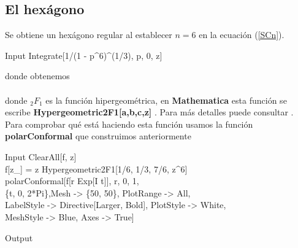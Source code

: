 \subsection{El hexágono}
Se obtiene un hexágono regular al establecer $n = 6$ en la ecuación (\ref{SCn}).
\begin{mmaCell}{Input}
  	 Integrate[1/(1 - p^6)^(1/3), {p, 0, z}]
\end{mmaCell} 
\vspace{-0.5 cm}donde obtenemos\\
\\
donde $_2F_1$ es la función hipergeométrica, en \textbf{Mathematica} esta función se escribe \textbf{ Hypergeometric2F1[a,b,c,z] }. Para más detalles puede consultar \cite{Hypergeometric2F1}.\\
Para comprobar qué está haciendo esta función usamos la función \textbf{polarConformal} que construimos anteriormente
\begin{mmaCell}{Input}
	 ClearAll[f, z]\\f[z_] = z Hypergeometric2F1[1/6, 1/3, 7/6, z^6]\\polarConformal[f[r Exp[I t]], {r, 0, 1},\\\{t, 0, 2*Pi\},Mesh -> \{50, 50\}, PlotRange -> All,\\LabelStyle -> Directive[Larger, Bold], PlotStyle -> White,\\MeshStyle -> Blue, Axes -> True]
\end{mmaCell}
\begin{mmaCell}[moregraphics={moreig={scale=0.8}}]{Output}
\end{mmaCell}

